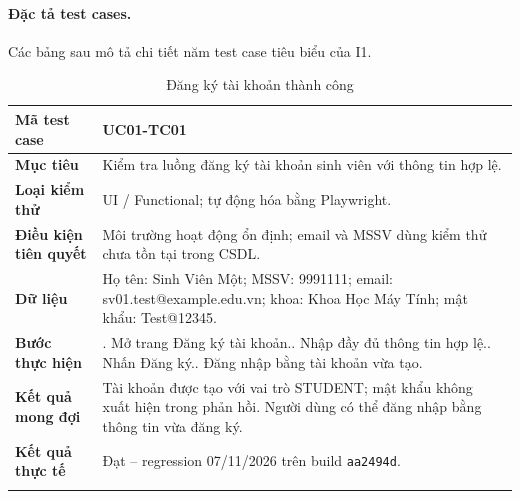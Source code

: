 \paragraph{Đặc tả test cases.}
Các bảng sau mô tả chi tiết năm test case tiêu biểu của I1.

\begin{table}[H]
\centering
\begingroup\small
\renewcommand{\arraystretch}{1.18}
\caption{Đăng ký tài khoản thành công}\label{tab:i1-detail-1}
\begin{tabularx}{\linewidth}{@{}p{.23\linewidth}>{\raggedright\arraybackslash}X@{}}
\toprule
\textbf{Mã test case} & \textbf{UC01-TC01} \\\midrule
\textbf{Mục tiêu} & Kiểm tra luồng đăng ký tài khoản sinh viên với thông tin hợp lệ. \\ \addlinespace[3pt]
\textbf{Loại kiểm thử} & UI / Functional; tự động hóa bằng Playwright. \\ \addlinespace[3pt]
\textbf{Điều kiện tiên quyết} & Môi trường hoạt động ổn định; email và MSSV dùng kiểm thử chưa tồn tại trong CSDL. \\ \addlinespace[3pt]
\textbf{Dữ liệu} & Họ tên: Sinh Viên Một; MSSV: 9991111; email: sv01.test@example.edu.vn; khoa: Khoa Học Máy Tính; mật khẩu: Test@12345. \\ \addlinespace[3pt]
\textbf{Bước thực hiện} & 1. Mở trang Đăng ký tài khoản.\newline 2. Nhập đầy đủ thông tin hợp lệ.\newline 3. Nhấn Đăng ký.\newline 4. Đăng nhập bằng tài khoản vừa tạo. \\ \addlinespace[3pt]
\textbf{Kết quả mong đợi} & Tài khoản được tạo với vai trò STUDENT; mật khẩu không xuất hiện trong phản hồi. Người dùng có thể đăng nhập bằng thông tin vừa đăng ký. \\ \addlinespace[3pt]
\textbf{Kết quả thực tế} & Đạt -- regression 07/11/2026 trên build \texttt{aa2494d}.\\ \addlinespace[3pt]
\bottomrule
\end{tabularx}
\endgroup
\end{table}


